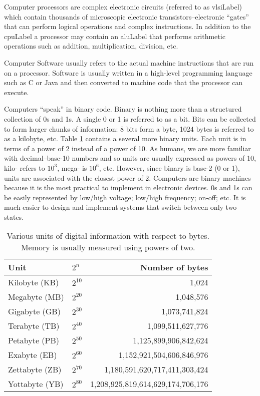 Computer processors are complex electronic circuits (referred to as
\gls{vlsiLabel}) which contain thousands of 
microscopic electronic transistors--electronic ``gates'' that can perform
logical operations and complex instructions.  In addition to the \gls{cpuLabel}
a processor may contain an \gls{aluLabel} that performs arithmetic 
operations such as addition, multiplication, division, etc.

Computer Software  usually refers to the actual machine instructions
that are run on a processor.  Software is usually written in a high-level
programming language such as C or Java and then converted to 
machine code that the processor can execute.

Computers ``speak'' in binary code.  Binary  is nothing more than a 
structured collection of 0s and 1s.  A single 0 or 1 is referred to as a \gls{bit}.  
Bits can be collected to form larger chunks of information: 8 bits form 
a \gls{byte}, 1024 bytes is referred to as a 
kilobyte, etc.  Table 
\ref{table:memoryUnits} contains a several more binary units.
Each unit is in terms of a power of 2 instead of a power of 10.  
As humans, we are more familiar with decimal--base-10 numbers
and so units are usually expressed as powers of 10, kilo- refers
to $10^3$, mega- is $10^6$, etc.  However, since binary is base-2
(0 or 1), units are associated with the closest power of 2.
Computers are binary machines because it is the most practical to
implement in electronic devices.  0s and 1s can be easily represented
by low/high voltage; low/high frequency; on-off; etc.  It is much easier
to design and implement systems that switch between only two states.

\begin{table}
\centering
\begin{tabular}{l|l|r}
Unit & $2^n$ & Number of bytes \\
\hline\hline
Kilobyte (KB) & $2^{10}$ & 1,024 \\
Megabyte (MB) & $2^{20}$ & 1,048,576 \\
Gigabyte (GB) & $2^{30}$ & 1,073,741,824 \\
Terabyte (TB) & $2^{40}$ & 1,099,511,627,776 \\
Petabyte (PB) & $2^{50}$ & 1,125,899,906,842,624 \\
Exabyte (EB) & $2^{60}$ &  1,152,921,504,606,846,976\\
Zettabyte (ZB) & $2^{70}$ &  1,180,591,620,717,411,303,424\\
Yottabyte (YB) & $2^{80}$ &  1,208,925,819,614,629,174,706,176\\
\end{tabular}
\caption[Memory Units]{Various units of digital information with 
respect to bytes.  Memory is usually measured using powers of two.}
\label{table:memoryUnits}
\end{table}

